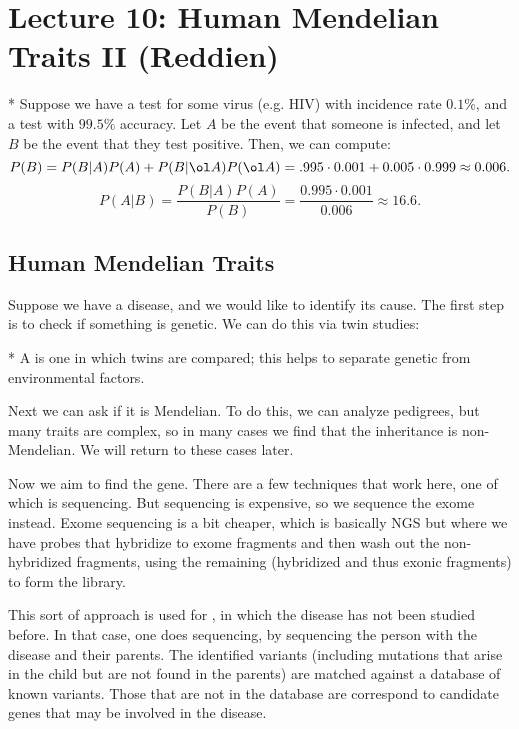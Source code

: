 \section*{Lecture 10: Human Mendelian Traits II (Reddien)}
\setcounter{section}{10}

\begin{exm}*
	Suppose we have a test for some virus (e.g. HIV) with incidence rate $0.1\%$, and a test with $99.5\%$ accuracy. Let $A$ be the event that someone is infected, and let $B$ be the event that they test positive.
	Then, we can compute: \[
		P(B) = P(B|A) P(A) + P(B|\ol A) P (\ol A) = .995 \cdot 0.001 + 0.005 \cdot 0.999 \approx 0.006. 
	\]
	\[
		P(A|B) = \frac{P(B|A) P(A)}{P(B)} = \frac{0.995 \cdot 0.001}{0.006} \approx 16.6.
	\]
\end{exm}

\subsection{Human Mendelian Traits}

Suppose we have a disease, and we would like to identify its cause.
The first step is to check if something is genetic. We can do this via twin studies:

\begin{defn}*
	A  is one in which twins are compared; this helps to separate genetic from environmental factors.
\end{defn}

Next we can ask if it is Mendelian. 
To do this, we can analyze pedigrees, but many traits are complex, so in many cases we find that the inheritance is non-Mendelian.
We will return to these cases later.

Now we aim to find the gene.
There are a few techniques that work here, one of which is sequencing. But sequencing is expensive, so we sequence the exome instead.
Exome sequencing is a bit cheaper, which is basically NGS but where we have probes that hybridize to exome fragments and then wash out the non-hybridized fragments, using the remaining (hybridized and thus exonic fragments) to form the library.

This sort of approach is used for , in which the disease has not been studied before. In that case, one does  sequencing, by sequencing the person with the disease and their parents. The identified variants (including  mutations that arise in the child but are not found in the parents) are matched against a database of known variants. Those that are not in the database are correspond to candidate genes that may be involved in the disease.

